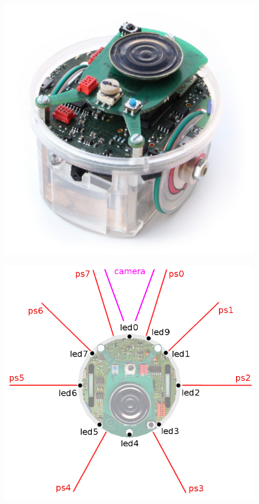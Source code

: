 \begin{figure}
	\centering
	\begin{minipage}{.5\textwidth}
		\centering
		\includegraphics[width=.75\linewidth]{epuck}
		\label{fig:epuck-pic}
	\end{minipage}%
	\begin{minipage}{.5\textwidth}
		\centering
		\includegraphics[width=1\linewidth]{e-puck_sensors_and_leds}
		\label{fig:epuck-sensors}
	\end{minipage}
\end{figure}

